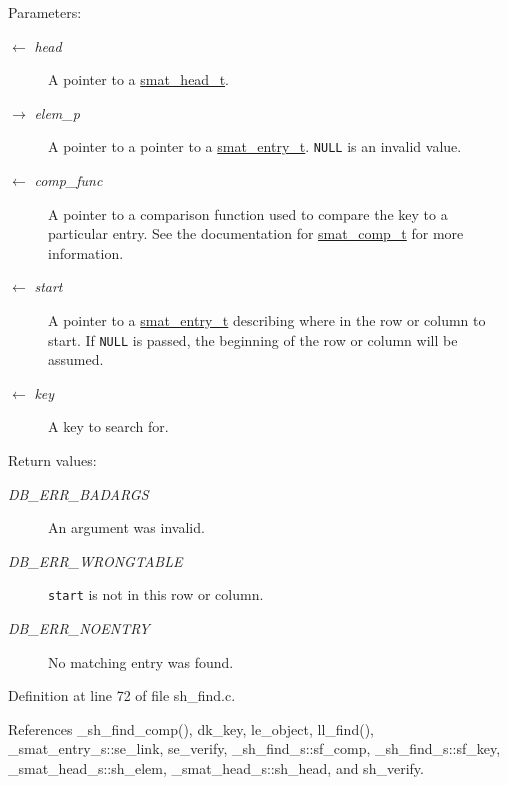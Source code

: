 \begin{Desc}
\item[Parameters:]
\begin{description}
\item[\mbox{$\leftarrow$} {\em head}]A pointer to a \hyperlink{group__dbprim__smat_ga1}{smat\_\-head\_\-t}. \item[\mbox{$\rightarrow$} {\em elem\_\-p}]A pointer to a pointer to a \hyperlink{group__dbprim__smat_ga2}{smat\_\-entry\_\-t}. {\tt NULL} is an invalid value. \item[\mbox{$\leftarrow$} {\em comp\_\-func}]A pointer to a comparison function used to compare the key to a particular entry. See the documentation for \hyperlink{group__dbprim__smat_ga5}{smat\_\-comp\_\-t} for more information. \item[\mbox{$\leftarrow$} {\em start}]A pointer to a \hyperlink{group__dbprim__smat_ga2}{smat\_\-entry\_\-t} describing where in the row or column to start. If {\tt NULL} is passed, the beginning of the row or column will be assumed. \item[\mbox{$\leftarrow$} {\em key}]A key to search for.\end{description}
\end{Desc}
\begin{Desc}
\item[Return values:]
\begin{description}
\item[{\em DB\_\-ERR\_\-BADARGS}]An argument was invalid. \item[{\em DB\_\-ERR\_\-WRONGTABLE}]{\tt start} is not in this row or column. \item[{\em DB\_\-ERR\_\-NOENTRY}]No matching entry was found.\end{description}
\end{Desc}


Definition at line 72 of file sh\_\-find.c.

References \_\-sh\_\-find\_\-comp(), dk\_\-key, le\_\-object, ll\_\-find(), \_\-smat\_\-entry\_\-s::se\_\-link, se\_\-verify, \_\-sh\_\-find\_\-s::sf\_\-comp, \_\-sh\_\-find\_\-s::sf\_\-key, \_\-smat\_\-head\_\-s::sh\_\-elem, \_\-smat\_\-head\_\-s::sh\_\-head, and sh\_\-verify.

